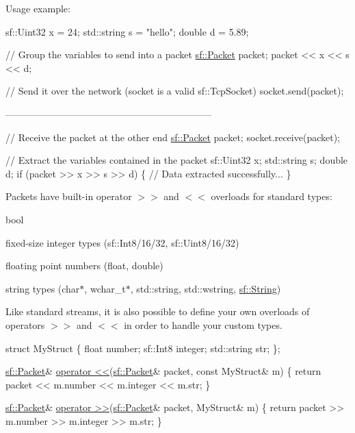 Usage example\+: 
\begin{DoxyCode}
sf::Uint32 x = 24;
std::string s = \textcolor{stringliteral}{"hello"};
\textcolor{keywordtype}{double} d = 5.89;

\textcolor{comment}{// Group the variables to send into a packet}
\hyperlink{classsf_1_1_packet}{sf::Packet} packet;
packet << x << s << d;

\textcolor{comment}{// Send it over the network (socket is a valid sf::TcpSocket)}
socket.send(packet);

-----------------------------------------------------------------

\textcolor{comment}{// Receive the packet at the other end}
\hyperlink{classsf_1_1_packet}{sf::Packet} packet;
socket.receive(packet);

\textcolor{comment}{// Extract the variables contained in the packet}
sf::Uint32 x;
std::string s;
\textcolor{keywordtype}{double} d;
\textcolor{keywordflow}{if} (packet >> x >> s >> d)
\{
    \textcolor{comment}{// Data extracted successfully...}
\}
\end{DoxyCode}


Packets have built-\/in operator $>$$>$ and $<$$<$ overloads for standard types\+: \begin{DoxyItemize}
\item bool \item fixed-\/size integer types (sf\+::\+Int8/16/32, sf\+::\+Uint8/16/32) \item floating point numbers (float, double) \item string types (char$\ast$, wchar\+\_\+t$\ast$, std\+::string, std\+::wstring, \hyperlink{classsf_1_1_string}{sf\+::\+String})\end{DoxyItemize}
Like standard streams, it is also possible to define your own overloads of operators $>$$>$ and $<$$<$ in order to handle your custom types.


\begin{DoxyCode}
\textcolor{keyword}{struct }MyStruct
\{
    \textcolor{keywordtype}{float}       number;
    sf::Int8    integer;
    std::string str;
\};

\hyperlink{classsf_1_1_packet}{sf::Packet}& \hyperlink{classsf_1_1_packet_aa5a465ed02ba29d83ecdafb0ac3fff21}{operator <<}(\hyperlink{classsf_1_1_packet}{sf::Packet}& packet, \textcolor{keyword}{const} MyStruct& m)
\{
    \textcolor{keywordflow}{return} packet << m.number << m.integer << m.str;
\}

\hyperlink{classsf_1_1_packet}{sf::Packet}& \hyperlink{classsf_1_1_packet_af8e26c63ba9bdccd262565ff0d3eeba2}{operator >>}(\hyperlink{classsf_1_1_packet}{sf::Packet}& packet, MyStruct& m)
\{
    \textcolor{keywordflow}{return} packet >> m.number >> m.integer >> m.str;
\}
\end{DoxyCode}


